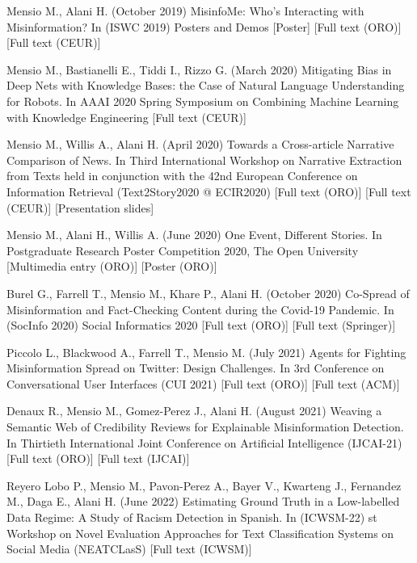 Mensio M., Alani H. (October 2019) MisinfoMe: Who’s Interacting with Misinformation? In (ISWC 2019) Posters and Demos [Poster] [Full text (ORO)] [Full text (CEUR)]


Mensio M., Bastianelli E., Tiddi I., Rizzo G. (March 2020) Mitigating Bias in Deep Nets with Knowledge Bases: the Case of Natural Language Understanding for Robots. In AAAI 2020 Spring Symposium on Combining Machine Learning with Knowledge Engineering [Full text (CEUR)]

Mensio M., Willis A., Alani H. (April 2020) Towards a Cross-article Narrative Comparison of News. In Third International Workshop on Narrative Extraction from Texts held in conjunction with the 42nd European Conference on Information Retrieval (Text2Story2020 @ ECIR2020) [Full text (ORO)] [Full text (CEUR)] [Presentation slides]

Mensio M., Alani H., Willis A. (June 2020) One Event, Different Stories. In Postgraduate Research Poster Competition 2020, The Open University [Multimedia entry (ORO)] [Poster (ORO)]

Burel G., Farrell T., Mensio M., Khare P., Alani H. (October 2020) Co-Spread of Misinformation and Fact-Checking Content during the Covid-19 Pandemic. In (SocInfo 2020) Social Informatics 2020 [Full text (ORO)] [Full text (Springer)]

Piccolo L., Blackwood A., Farrell T., Mensio M. (July 2021) Agents for Fighting Misinformation Spread on Twitter: Design Challenges. In 3rd Conference on Conversational User Interfaces (CUI 2021) [Full text (ORO)] [Full text (ACM)]

Denaux R., Mensio M., Gomez-Perez J., Alani H. (August 2021) Weaving a Semantic Web of Credibility Reviews for Explainable Misinformation Detection. In Thirtieth International Joint Conference on Artificial Intelligence (IJCAI-21) [Full text (ORO)] [Full text (IJCAI)]

Reyero Lobo P., Mensio M., Pavon-Perez A., Bayer V., Kwarteng J., Fernandez M., Daga E., Alani H. (June 2022) Estimating Ground Truth in a Low-labelled Data Regime: A Study of Racism Detection in Spanish. In (ICWSM-22) st Workshop on Novel Evaluation Approaches for Text Classification Systems on Social Media (NEATCLasS) [Full text (ICWSM)]
